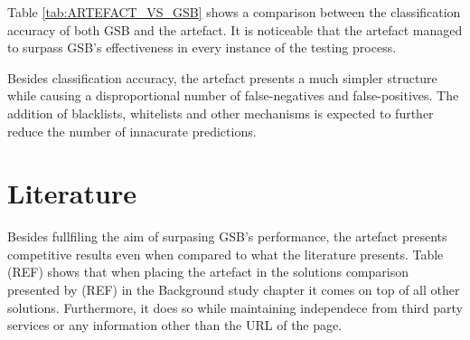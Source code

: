 Table \ref{tab:ARTEFACT_VS_GSB} shows a comparison between the classification accuracy of both GSB and the artefact. It is noticeable that the artefact managed to surpass GSB's effectiveness in every instance of the testing process.

Besides classification accuracy, the artefact presents a much simpler structure while causing a disproportional number of false-negatives and false-positives. The addition of blacklists, whitelists and other mechanisms is expected to further reduce the number of innacurate predictions.



\section{Literature}
Besides fullfiling the aim of surpasing GSB's performance, the artefact presents competitive results even when compared to what the literature presents. Table (REF) shows that when placing the artefact in the solutions comparison presented by (REF) in the Background study chapter it comes on top of all other solutions. Furthermore, it does so while maintaining independece from third party services or any information other than the URL of the page.

